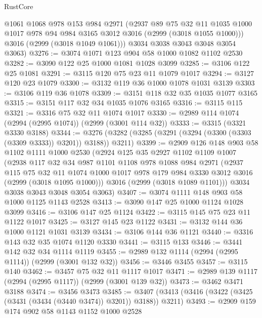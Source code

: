 \begin{lexlean}{RustCore}
\begin{coremodule}
        @1061
        @1068
        @978
        @153
        @984
        @2971
        (@2937
          @89
          @75
          @32
          @11
          @1035
          @1000
          @1017
          @978
          @94
          @984
          @3165
          @3012
          @3016
          (@2999 (@3018 @1055 @1000)))
        @3016
        (@2999 (@3018 @1049 @1061)))
      @3034
      @3038
      @3043
      @3048
      @3054
      @3063)
@3276 := @3074 @1071 @123 @904 @58 @1000 @1082 @1102 @2530
@3282 := @3090 @122 @25 @1000 @1081 @1028 @3099
@3285 := @3106 @122 @25 @1081
@3291 := @3115 @120 @75 @23 @11 @1079 @1017
@3294 := @3127 @120 @23 @1079
@3300 := @3132 @119 @36 @1000 @1078 @1031 @3139
@3303 := @3106 @119 @36 @1078
@3309 := @3151 @118 @32 @35 @1035 @1077 @3165
@3315 := @3151 @117 @32 @34 @1035 @1076 @3165
@3316 := @3115 @115
@3321 := @3316 @75 @32 @11 @1074 @1017
@3330 := @2989 @114 @1074 (@2994 (@2995 @1074)) (@2999 (@3001 @114 @32))
@3333 := @3315 (@3321 @3330 @3188)
@3344 := @3276 (@3282 (@3285 (@3291 (@3294 (@3300 (@3303 (@3309 @3333)) @3201)) @3188)) @3211)
@3399 := @2909
    @126
    @148
    @903
    @58
    @1102
    @1111
    @1000
    @2530
    (@2924
      @125
      @35
      @2927
      @1102
      @1109
      @1007
      (@2938
        @117
        @32
        @34
        @987
        @1101
        @1108
        @978
        @1088
        @984
        @2971
        (@2937
          @115
          @75
          @32
          @11
          @1074
          @1000
          @1017
          @978
          @179
          @984
          @3330
          @3012
          @3016
          (@2999 (@3018 @1095 @1000)))
        @3016
        (@2999 (@3018 @1089 @1101)))
      @3034
      @3038
      @3043
      @3048
      @3054
      @3063)
@3407 := @3074 @1111 @148 @903 @58 @1000 @1125 @1143 @2528
@3413 := @3090 @147 @25 @1000 @1124 @1028 @3099
@3416 := @3106 @147 @25 @1124
@3422 := @3115 @145 @75 @23 @11 @1122 @1017
@3425 := @3127 @145 @23 @1122
@3431 := @3132 @144 @36 @1000 @1121 @1031 @3139
@3434 := @3106 @144 @36 @1121
@3440 := @3316 @143 @32 @35 @1074 @1120 @3330
@3441 := @3115 @133
@3446 := @3441 @142 @32 @34 @1114 @1119
@3455 := @2989 @132 @1114 (@2994 (@2995 @1114)) (@2999 (@3001 @132 @32))
@3456 := @3446 @3455
@3457 := @3115 @140
@3462 := @3457 @75 @32 @11 @1117 @1017
@3471 := @2989 @139 @1117 (@2994 (@2995 @1117)) (@2999 (@3001 @139 @32))
@3473 := @3462 @3471 @3188
@3474 := @3456 @3473
@3485 := @3407 (@3413 (@3416 (@3422 (@3425 (@3431 (@3434 (@3440 @3474)) @3201)) @3188)) @3211)
@3493 := @2909 @159 @174 @902 @58 @1143 @1152 @1000 @2528

\end{coremodule}
\end{lexlean}
